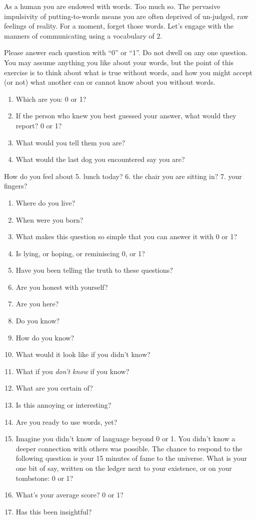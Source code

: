 \documentclass[
]{book}
\providecommand{\tightlist}{%
  \setlength{\itemsep}{0pt}\setlength{\parskip}{0pt}}
\begin{document}
As a human you are endowed with words.
Too much so. The pervasive impulsivity of putting-to-words means you are often deprived
of un-judged, raw feelings of reality.
For a moment, forget those words.
Let's engage with the manners of communicating
using a vocabulary of 2.

Please answer each question with ``0'' or ``1''.
Do not dwell on any one question.
You may assume anything you like about your words,
but the point of this exercise is to think about what is true without words, and how you might accept (or not)
what another can or cannot know about you without words.

\begin{enumerate}
\def\labelenumi{\arabic{enumi}.}
\tightlist
\item
  Which are you: 0 or 1?
\item
  If the person who knew you best guessed your answer,
  what would they report? 0 or 1?
\item
  What would you tell them you are?
\item
  What would the last dog you encountered say you are?
\end{enumerate}

How do you feel about
5. lunch today?
6. the chair you are sitting in?
7. your fingers?

\begin{enumerate}
\def\labelenumi{\arabic{enumi}.}
\setcounter{enumi}{7}
\item
  Where do you live?
\item
  When were you born?
\item
  What makes this question so simple that you can answer it
  with 0 or 1?
\item
  Is lying, or hoping, or reminiscing 0, or 1?
\item
  Have you been telling the truth to these questions?
\item
  Are you honest with yourself?
\item
  Are you here?
\item
  Do you know?
\item
  How do you know?
\item
  What would it look like if you didn't know?
\item
  What if you \emph{don't know} if you know?
\item
  What are you certain of?
\item
  Is this annoying or interesting?
\item
  Are you ready to use words, yet?
\item
  Imagine you didn't know of language beyond 0 or 1.
  You didn't know a deeper connection with others was possible.
  The chance to respond to the following question is
  your 15 minutes of fame to the universe.
  What is your one bit of say,
  written on the ledger next to your existence, or
  on your tombstone: 0 or 1?
\item
  What's your average score? 0 or 1?
\item
  Has this been insightful?
\end{enumerate}
\end{document}
